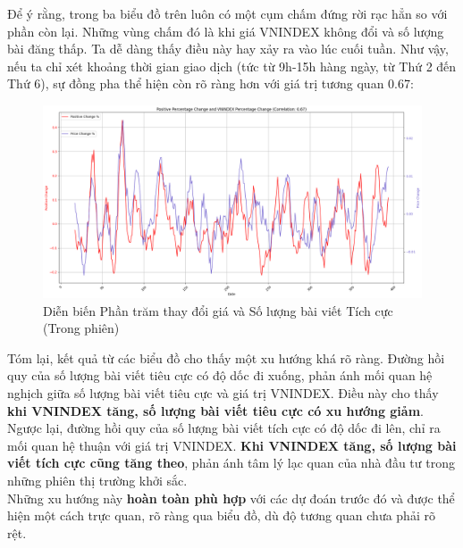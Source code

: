 Để ý rằng, trong ba biểu đồ trên luôn có một cụm chấm đứng rời rạc hẳn so với phần còn lại. Những vùng chấm đó là khi giá VNINDEX không đổi và số lượng bài đăng thấp. Ta dễ dàng thấy điều này hay xảy ra vào lúc cuối tuần. Như vậy, nếu ta chỉ xét khoảng thời gian giao dịch (tức từ 9h-15h hàng ngày, từ Thứ 2 đến Thứ 6), sự đồng pha thể hiện còn rõ ràng hơn với giá trị tương quan 0.67:

\begin{figure}[H]
    \centering
    \includegraphics[width=1\linewidth]{images/plot-4.6-in.png}
    \caption{Diễn biến Phần trăm thay đổi giá và Số lượng bài viết Tích cực (Trong phiên)}
    \label{fig:4.6}
\end{figure}

Tóm lại, kết quả từ các biểu đồ cho thấy một xu hướng khá rõ ràng. Đường hồi quy của số lượng bài viết tiêu cực có độ dốc đi xuống, phản ánh mối quan hệ nghịch giữa số lượng bài viết tiêu cực và giá trị VNINDEX. Điều này cho thấy \textbf{khi VNINDEX tăng, số lượng bài viết tiêu cực có xu hướng giảm}.\\

Ngược lại, đường hồi quy của số lượng bài viết tích cực có độ dốc đi lên, chỉ ra mối quan hệ thuận với giá trị VNINDEX. \textbf{Khi VNINDEX tăng, số lượng bài viết tích cực cũng tăng theo}, phản ánh tâm lý lạc quan của nhà đầu tư trong những phiên thị trường khởi sắc.\\

Những xu hướng này \textbf{hoàn toàn phù hợp} với các dự đoán trước đó và được thể hiện một cách trực quan, rõ ràng qua biểu đồ, dù độ tương quan chưa phải rõ rệt.
